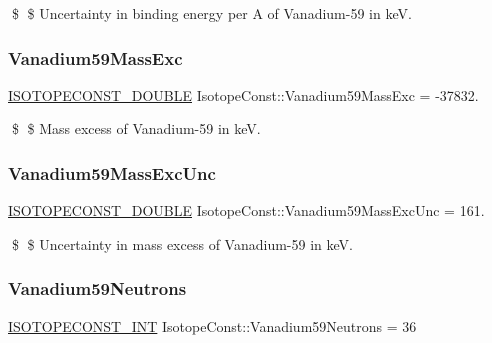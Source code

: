 \$ \$ Uncertainty in binding energy per A of Vanadium-\/59 in keV. \mbox{\label{group___isotope_const-_vanadium-_v59_ga879516dcdad15a704462219644395ab4}} 
\subsubsection{\texorpdfstring{Vanadium59\+Mass\+Exc}{Vanadium59MassExc}}
{\footnotesize\ttfamily \mbox{\hyperlink{group___isotope_const-_macros_ga8f45a7272ce02c0b4c65c44636ed719a}{I\+S\+O\+T\+O\+P\+E\+C\+O\+N\+S\+T\+\_\+\+D\+O\+U\+B\+LE}} Isotope\+Const\+::\+Vanadium59\+Mass\+Exc = -\/37832.}

\$ \$ Mass excess of Vanadium-\/59 in keV. \mbox{\label{group___isotope_const-_vanadium-_v59_gad8c540c3b7854a7bf6eb965db69622c7}} 
\subsubsection{\texorpdfstring{Vanadium59\+Mass\+Exc\+Unc}{Vanadium59MassExcUnc}}
{\footnotesize\ttfamily \mbox{\hyperlink{group___isotope_const-_macros_ga8f45a7272ce02c0b4c65c44636ed719a}{I\+S\+O\+T\+O\+P\+E\+C\+O\+N\+S\+T\+\_\+\+D\+O\+U\+B\+LE}} Isotope\+Const\+::\+Vanadium59\+Mass\+Exc\+Unc = 161.}

\$ \$ Uncertainty in mass excess of Vanadium-\/59 in keV. \mbox{\label{group___isotope_const-_vanadium-_v59_ga67e747d2b61ea8ebdd331f8112ff776b}} 
\subsubsection{\texorpdfstring{Vanadium59\+Neutrons}{Vanadium59Neutrons}}
{\footnotesize\ttfamily \mbox{\hyperlink{group___isotope_const-_macros_ga5f18360b3e99483a35c32d789e62621c}{I\+S\+O\+T\+O\+P\+E\+C\+O\+N\+S\+T\+\_\+\+I\+NT}} Isotope\+Const\+::\+Vanadium59\+Neutrons = 36}

